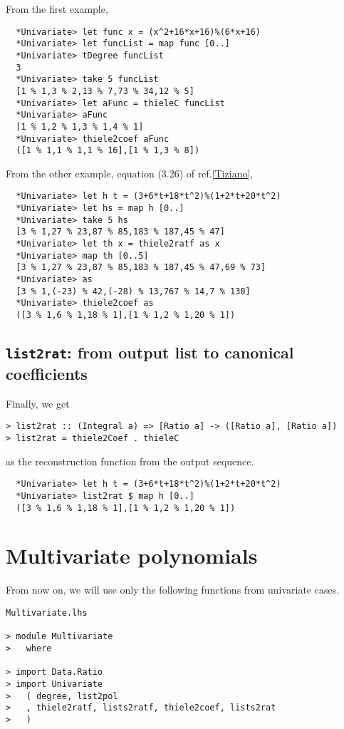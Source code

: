 \documentclass[11pt]{book}
\begin{document}
From the first example,
\begin{verbatim}
  *Univariate> let func x = (x^2+16*x+16)%(6*x+16)
  *Univariate> let funcList = map func [0..]
  *Univariate> tDegree funcList 
  3
  *Univariate> take 5 funcList 
  [1 % 1,3 % 2,13 % 7,73 % 34,12 % 5]
  *Univariate> let aFunc = thieleC funcList 
  *Univariate> aFunc
  [1 % 1,2 % 1,3 % 1,4 % 1]
  *Univariate> thiele2coef aFunc
  ([1 % 1,1 % 1,1 % 16],[1 % 1,3 % 8])
\end{verbatim}

From the other example, equation (3.26) of ref.\ref{Tiziano},
\begin{verbatim}
  *Univariate> let h t = (3+6*t+18*t^2)%(1+2*t+20*t^2)
  *Univariate> let hs = map h [0..]
  *Univariate> take 5 hs
  [3 % 1,27 % 23,87 % 85,183 % 187,45 % 47]
  *Univariate> let th x = thiele2ratf as x
  *Univariate> map th [0..5]
  [3 % 1,27 % 23,87 % 85,183 % 187,45 % 47,69 % 73]
  *Univariate> as
  [3 % 1,(-23) % 42,(-28) % 13,767 % 14,7 % 130]
  *Univariate> thiele2coef as
  ([3 % 1,6 % 1,18 % 1],[1 % 1,2 % 1,20 % 1])
\end{verbatim}

\subsection{\texttt{list2rat}: from output list to canonical coefficients}
Finally, we get
\begin{verbatim}
> list2rat :: (Integral a) => [Ratio a] -> ([Ratio a], [Ratio a])
> list2rat = thiele2Coef . thieleC
\end{verbatim}
as the reconstruction function from the output sequence.
\begin{verbatim}
  *Univariate> let h t = (3+6*t+18*t^2)%(1+2*t+20*t^2)
  *Univariate> list2rat $ map h [0..]
  ([3 % 1,6 % 1,18 % 1],[1 % 1,2 % 1,20 % 1])
\end{verbatim}

\section{Multivariate polynomials}
From now on, we will use only the following functions from univariate cases.
\begin{verbatim}
Multivariate.lhs

> module Multivariate 
>   where

> import Data.Ratio
> import Univariate 
>   ( degree, list2pol
>   , thiele2ratf, lists2ratf, thiele2coef, lists2rat
>   )
\end{verbatim}
\end{document}

